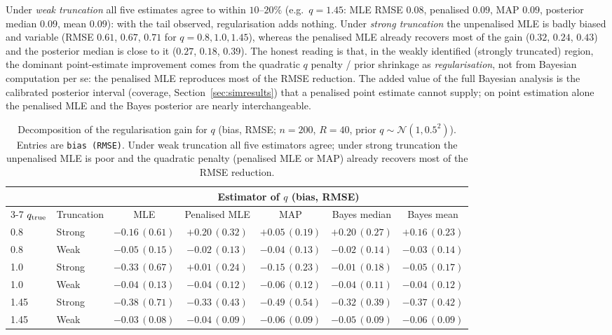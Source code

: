 \documentclass[ASNA,twocolumn]{USG}
\begin{document}
Under \emph{weak truncation} all five estimates agree to within $10$--$20\%$
(e.g.\ $q=1.45$: MLE RMSE $0.08$, penalised $0.09$, MAP $0.09$, posterior
median $0.09$, mean $0.09$): with the tail observed, regularisation adds
nothing. Under \emph{strong truncation} the unpenalised MLE is badly biased
and variable (RMSE $0.61$, $0.67$, $0.71$ for $q=0.8,1.0,1.45$), whereas the
penalised MLE already recovers most of the gain ($0.32$, $0.24$, $0.43$) and
the posterior median is close to it ($0.27$, $0.18$, $0.39$). The honest
reading is that, in the weakly identified (strongly truncated) region, the
dominant point-estimate improvement comes from the quadratic $q$ penalty /
prior shrinkage as \emph{regularisation}, not from Bayesian computation per
se: the penalised MLE reproduces most of the RMSE reduction. The added value
of the full Bayesian analysis is the calibrated posterior interval (coverage,
Section~\ref{sec:simresults}) that a penalised point estimate cannot supply;
on point estimation alone the penalised MLE and the Bayes posterior are
nearly interchangeable.

\begin{table}[ht]
\centering
\caption{Decomposition of the regularisation gain for $q$
(bias, RMSE; $n=200$, $R=40$, prior $q\sim\mathcal N(1,0.5^2)$).
Entries are \texttt{bias (RMSE)}. Under weak truncation all five
estimators agree; under strong truncation the unpenalised MLE is poor and
the quadratic penalty (penalised MLE or MAP) already recovers most of the
RMSE reduction.}
\label{tab:penalty}
\footnotesize
\begin{tabular}{@{}llccccc@{}}
\toprule
 &  & \multicolumn{5}{c}{Estimator of $q$ (bias, RMSE)}\\
\cmidrule(lr){3-7}
$q_{\rm true}$ & Truncation & MLE & Penalised MLE & MAP & Bayes median & Bayes mean\\
\midrule
0.8  & Strong & $-0.16\,(0.61)$ & $+0.20\,(0.32)$ & $+0.05\,(0.19)$ & $+0.20\,(0.27)$ & $+0.16\,(0.23)$\\
0.8  & Weak   & $-0.05\,(0.15)$ & $-0.02\,(0.13)$ & $-0.04\,(0.13)$ & $-0.02\,(0.14)$ & $-0.03\,(0.14)$\\
1.0  & Strong & $-0.33\,(0.67)$ & $+0.01\,(0.24)$ & $-0.15\,(0.23)$ & $-0.01\,(0.18)$ & $-0.05\,(0.17)$\\
1.0  & Weak   & $-0.04\,(0.13)$ & $-0.04\,(0.12)$ & $-0.06\,(0.12)$ & $-0.04\,(0.11)$ & $-0.04\,(0.12)$\\
1.45 & Strong & $-0.38\,(0.71)$ & $-0.33\,(0.43)$ & $-0.49\,(0.54)$ & $-0.32\,(0.39)$ & $-0.37\,(0.42)$\\
1.45 & Weak   & $-0.03\,(0.08)$ & $-0.04\,(0.09)$ & $-0.06\,(0.09)$ & $-0.05\,(0.09)$ & $-0.06\,(0.09)$\\
\bottomrule
\end{tabular}
\end{table}
\end{document}
